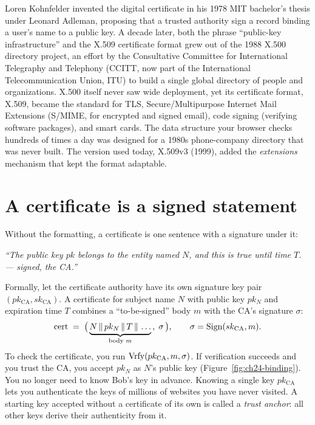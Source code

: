 \begin{historybox}
Loren Kohnfelder invented the digital certificate in his 1978 MIT bachelor's thesis under Leonard Adleman, proposing that a trusted authority sign a record binding a user's name to a public key. A decade later, both the phrase ``public-key infrastructure'' and the X.509 certificate format grew out of the 1988 X.500 directory project, an effort by the Consultative Committee for International Telegraphy and Telephony (CCITT, now part of the International Telecommunication Union, ITU) to build a single global directory of people and organizations. X.500 itself never saw wide deployment, yet its certificate format, X.509, became the standard for TLS, Secure/Multipurpose Internet Mail Extensions (S/MIME, for encrypted and signed email), code signing (verifying software packages), and smart cards. The data structure your browser checks hundreds of times a day was designed for a 1980s phone-company directory that was never built. The version used today, X.509v3 (1999), added the \emph{extensions} mechanism that kept the format adaptable.
\end{historybox}

\section{A certificate is a signed statement}
\label{ch24:cert-as-signature}

Without the formatting, a certificate is one sentence with a signature under it:

\begin{center}
\itshape ``The public key $pk$ belongs to the entity named $N$, and this is true until time $T$. --- signed, the CA.''
\end{center}

Formally, let the certificate authority have its own signature key pair $(pk_{\mathrm{CA}}, sk_{\mathrm{CA}})$. A certificate for subject name $N$ with public key $pk_N$ and expiration time $T$ combines a ``to-be-signed'' body $m$ with the CA's signature $\sigma$:
\[
\mathrm{cert} \;=\; \bigl(\, \underbrace{N \,\|\, pk_N \,\|\, T \,\|\, \dots}_{\text{body } m} \,,\; \sigma \,\bigr),
\qquad
\sigma = \operatorname{Sign}(sk_{\mathrm{CA}}, m).
\]
To check the certificate, you run $\operatorname{Vrfy}(pk_{\mathrm{CA}}, m, \sigma)$. If verification succeeds and you trust the CA, you accept $pk_N$ as $N$'s public key (Figure~\ref{fig:ch24-binding}). You no longer need to know Bob's key in advance. Knowing a single key $pk_{\mathrm{CA}}$ lets you authenticate the keys of millions of websites you have never visited. A starting key accepted without a certificate of its own is called a \emph{trust anchor}: all other keys derive their authenticity from it.

